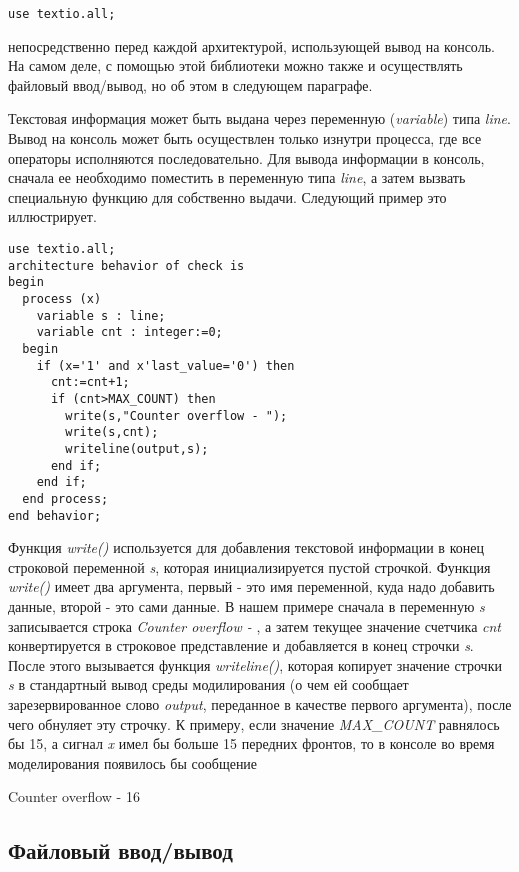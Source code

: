 \begin{lstlisting}
use textio.all;
\end{lstlisting}
непосредственно перед каждой архитектурой, использующей вывод на консоль. На самом деле, с помощью этой библиотеки можно также и осуществлять файловый ввод/вывод, но об этом в следующем параграфе. 

Текстовая информация может быть выдана через переменную (\emph{variable}) типа \emph{line}. Вывод на консоль может быть осуществлен только изнутри процесса, где все операторы исполняются последовательно. Для вывода информации в консоль, сначала ее необходимо поместить в переменную типа \emph{line}, а затем вызвать специальную функцию для собственно выдачи. Следующий пример это иллюстрирует.

\begin{Code}
\begin{lstlisting}[caption=Вывод в консоль]
use textio.all;
architecture behavior of check is
begin
  process (x)
    variable s : line;
    variable cnt : integer:=0;
  begin
    if (x='1' and x'last_value='0') then
      cnt:=cnt+1;
      if (cnt>MAX_COUNT) then
        write(s,"Counter overflow - ");
        write(s,cnt);
        writeline(output,s);
      end if;
    end if;
  end process;
end behavior;
\end{lstlisting}
\end{Code}


Функция \emph{write()} используется для добавления текстовой информации в конец строковой переменной \emph{s}, которая инициализируется пустой строчкой. Функция \emph{write()} имеет два аргумента, первый - это имя переменной, куда надо добавить данные, второй - это сами данные. В нашем примере сначала в переменную \emph{s} записывается строка \emph{Counter overflow - }, а затем текущее значение счетчика \emph{cnt} конвертируется в строковое представление и добавляется в конец строчки \emph{s}. После этого вызывается функция \emph{writeline()}, которая копирует значение строчки \emph{s} в стандартный вывод среды модилирования (о чем ей сообщает зарезервированное слово \emph{output}, переданное в качестве первого аргумента), после чего обнуляет эту строчку. К примеру, если значение \emph{MAX\_COUNT} равнялось бы 15, а сигнал \emph{x} имел бы больше 15 передних фронтов, то в консоле во время моделирования появилось бы сообщение 

Counter overflow - 16

\subsection{Файловый ввод/вывод}

